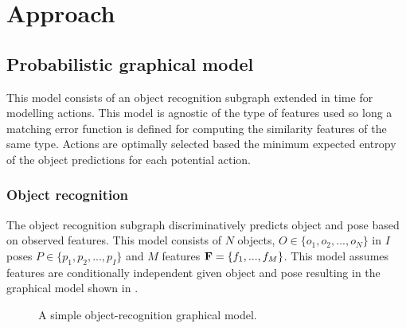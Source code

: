 \section{Approach}


    \subsection{Probabilistic graphical model}
        This model consists of an object recognition subgraph extended in time for modelling actions. This model is agnostic of the type of features used so long a matching error function is defined for computing the similarity features of the same type. Actions are optimally selected based the minimum expected entropy of the object predictions for each potential action.
            
        \subsubsection{Object recognition}
            The object recognition subgraph discriminatively predicts object and pose based on observed features. This model consists of $N$ objects, $O \in \{o_1,o_2, ..., o_N\}$ in $I$ poses $P \in \{p_1,p_2, ..., p_I\}$ and $M$ features $\mathbf{F} = \left\{ f_1, ...,  f_M\right\}$. This model assumes features are conditionally independent given object and pose resulting in the graphical model shown in .

            \begin{figure}[h]
              \centering
              \caption{A simple object-recognition graphical model.}
              \label{fig:objectRecognitionSubgraph}
            \end{figure}

